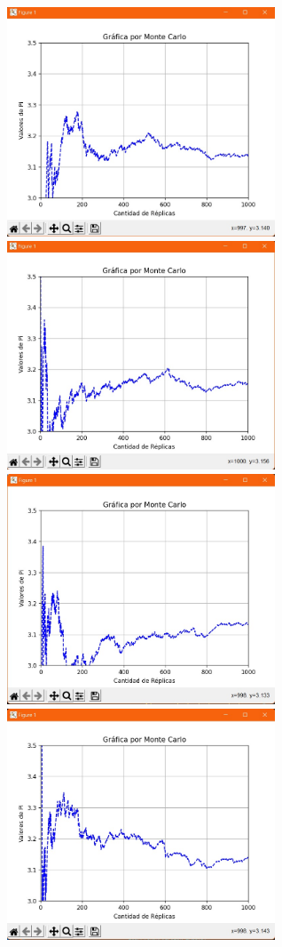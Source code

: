 \documentclass{article}
\begin{document}
\begin{figure}[H] %
    \centering
    \includegraphics[width=80mm]{60.jpeg} %
    \centering
    \includegraphics[width=80mm]{125.jpeg} %
    \centering
    \includegraphics[width=80mm]{250.jpeg} %
    \centering
    \includegraphics[width=80mm]{500.jpeg} %

\end{figure}
\end{document}
